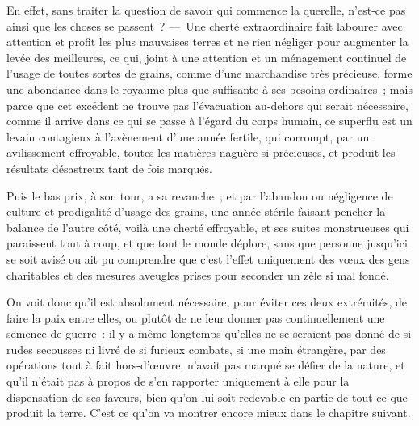 \documentclass[french,twoside]{book} %
\begin{document}
En effet, sans traiter la question de savoir qui commence la querelle, n’est-ce pas ainsi que les choses se passent ? — Une cherté extraordinaire fait labourer avec attention et profit les plus mauvaises terres et ne rien négliger pour augmenter la levée des meilleures, ce qui, joint à une attention et un ménagement continuel de l’usage de toutes sortes de grains, comme d’une marchandise très précieuse, forme une abondance dans le royaume plus que suffisante à ses besoins ordinaires ; mais parce que cet excédent ne trouve pas l’évacuation au-dehors qui serait nécessaire, comme il arrive dans ce qui se passe à l’égard du corps humain, ce superflu est un levain contagieux à l’avènement d’une année fertile, qui corrompt, par un avilissement effroyable, toutes les matières naguère si précieuses, et produit les résultats désastreux tant de fois marqués.\par
Puis le bas prix, à son tour, a sa revanche ; et par l’abandon ou négligence de culture et prodigalité d’usage des grains, une année stérile faisant pencher la balance de l’autre côté, voilà une cherté effroyable, et ses suites monstrueuses qui paraissent tout à coup, et que tout le monde déplore, sans que personne jusqu’ici se soit avisé ou ait pu comprendre que c’est l’effet uniquement des vœux des gens charitables et des mesures aveugles prises pour seconder un zèle si mal fondé.\par
On voit donc qu’il est absolument nécessaire, pour éviter ces deux extrémités, de faire la paix entre elles, ou plutôt de ne leur donner pas continuellement une semence de guerre : il y a même longtemps qu’elles ne se seraient pas donné de si rudes secousses ni livré de si furieux combats, si une main étrangère, par des opérations tout à fait hors-d’œuvre, n’avait pas marqué se défier de la nature, et qu’il n’était pas à propos de s’en rapporter uniquement à elle pour la dispensation de ses faveurs, bien qu’on lui soit redevable en partie de tout ce que produit la terre. C’est ce qu’on va montrer encore mieux dans le chapitre suivant.
\end{document}
